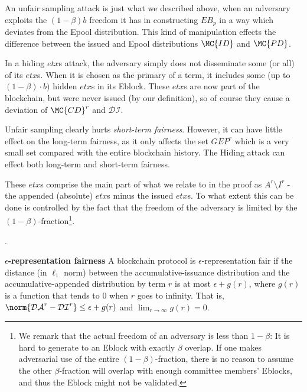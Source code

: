 An unfair sampling attack is just what we described above, when an adversary exploits the $(1-\beta)b$ freedom it has in constructing $EB_p$ in a way which deviates from the Epool distribution. This kind of manipulation effects the difference between the issued and Epool distributions $\MC{ID}$ and $\MC{PD}$. 

In a hiding $etx$s attack, the adversary simply does not disseminate some (or all) of its $etx$s. When it is chosen as the primary of a term, it includes some (up to $(1-\beta)\cdot b)$ hidden $etx$s in its Eblock. These $etx$s are now part of the blockchain, but were never issued (by our definition), so of course they cause a deviation of $\MC{CD}^r$ and $\mathcal{DI}$. 

Unfair sampling clearly hurts \textit{short-term fairness}. However, it can have little effect on the long-term fairness, as it only affects the set $GEP^r$ which is a very small set compared with the entire blockchain history. The Hiding attack can effect both long-term and short-term fairness.

 These $etx$s comprise the main part of what we relate to in the proof as $A^r\setminus I^r$ - the appended (absolute) $etx$s minus the issued $etx$s. To what extent this can be done is controlled by the fact that the freedom of the adversary is limited by the $(1-\beta)$-fraction\footnote{We remark that the actual freedom of an adversary is less than $1-\beta$: It is hard to generate to an Eblock with exactly $\beta$ overlap. If one makes adversarial use of the entire $(1-\beta)$-fraction, there is no reason to assume the other $\beta$-fraction will overlap with enough committee members' Eblocks, and thus the Eblock might not be validated.}.


.
\begin{definition}{\textbf{$\epsilon$-representation fairness}} A blockchain protocol is $\epsilon$-representation fair if the distance (in $\ell _1$ norm) between the accumulative-issuance distribution and the accumulative-appended distribution by term $r$ is at most $\epsilon+g(r)$, where $g(r)$ is a function that tends to $0$ when $r$ goes to infinity. That is,  $\norm{\mathcal{DA}^r-\mathcal{DI}^{r}}\leq \epsilon+g(r)$ and $\lim _{r\rightarrow \infty}g(r)=0$.
\end{definition}
 

